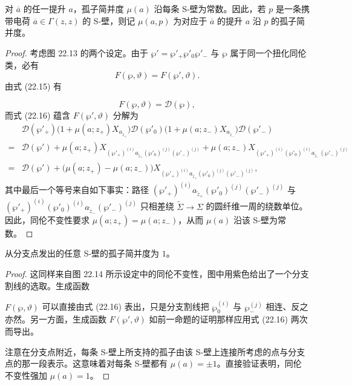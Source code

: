\begin{proposition}[22.25]
对 $\overline{a}$ 的任一提升 $a$，孤子简并度 $\mu(a)$ 沿每条 S-壁为常数。因此，若 $p$ 是一条携带电荷 $\overline{a}\in\Gamma(z,z)$ 的 S-壁，则记 $\mu(a,p)$ 为对应于 $\overline{a}$ 的提升 $a$ 沿 $p$ 的孤子简并度。
\end{proposition}

\begin{proof}
考虑图 22.13 的两个设定。由于 $\wp'=\wp'_+\wp'_0\wp'_-$ 与 $\wp$ 属于同一个扭化同伦类，必有
\[
F(\wp,\vartheta)=F(\wp',\vartheta).
\]
由式 (22.15) 有


\[
F(\wp,\vartheta)=\mathcal{D}(\wp),
\]
而式 (22.16) 蕴含 $F(\wp',\vartheta)$ 分解为
\begin{align*}
&\mathcal{D}(\wp'_+)\big(1+\mu(a;z_+)X_{a_{\widetilde{z}_+}}\big)\mathcal{D}(\wp'_0)\big(1+\mu(a;z_-)X_{a_{\widetilde{z}_-}}\big)\mathcal{D}(\wp'_-)\\
={}&\mathcal{D}(\wp')+\mu(a;z_+)X_{(\wp'_+)^{(i)}a_{\widetilde{z}_+}(\wp'_0)^{(j)}(\wp'_-)^{(j)}}+\mu(a;z_-)X_{(\wp'_+)^{(i)}(\wp'_0)^{(i)}a_{\widetilde{z}_-}(\wp'_-)^{(j)}}\\
={}&\mathcal{D}(\wp')+\big(\mu(a;z_+)-\mu(a;z_-)\big)X_{(\wp'_+)^{(i)}a_{\widetilde{z}_+}(\wp'_0)^{(j)}(\wp'_-)^{(j)}},
\end{align*}
其中最后一个等号来自如下事实：路径 $(\wp'_+)^{(i)}a_{\widetilde{z}_+}(\wp'_0)^{(j)}(\wp'_-)^{(j)}$ 与 $(\wp'_+)^{(i)}(\wp'_0)^{(i)}a_{\widetilde{z}_-}(\wp'_-)^{(j)}$ 只相差绕 $\widetilde{\Sigma}\to\Sigma$ 的圆纤维一周的绕数单位。因此，同伦不变性要求 $\mu(a;z_+)=\mu(a;z_-)$，从而 $\mu(a)$ 沿该 S-壁为常数。
\end{proof}

\begin{proposition}[22.26]
从分支点发出的任意 S-壁的孤子简并度为 $1$。
\end{proposition}

\begin{proof}
这同样来自图 22.14 所示设定中的同伦不变性，图中用紫色给出了一个分支割线的选取。生成函数


$F(\wp,\vartheta)$ 可以直接由式 (22.16) 表出，只是分支割线把 $\wp^{(i)}_0$ 与 $\wp^{(j)}_-$ 相连、反之亦然。另一方面，生成函数 $F(\wp',\vartheta)$ 如前一命题的证明那样应用式 (22.16) 两次而导出。

注意在分支点附近，每条 S-壁上所支持的孤子由该 S-壁上连接所考虑的点与分支点的那一段表示。这意味着对每条 S-壁都有 $\mu(a)=\pm1$。直接验证表明，同伦不变性强加 $\mu(a)=1$。
\end{proof}

